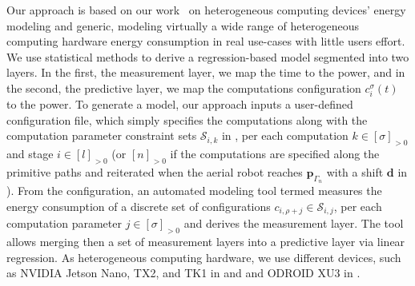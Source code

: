 Our approach is based on our work~\citep{seewald2019coarse} on heterogeneous computing devices' energy modeling and generic, modeling virtually a wide range of heterogeneous computing hardware energy consumption in real use-cases with little users effort. We use statistical methods to derive a regression-based model segmented into two layers. In the first, the measurement layer, we map the time to the power, and in the second, the predictive layer, we map the computations configuration $c_{i}^\sigma(t)$ to the power. To generate a model, our approach inputs a user-defined configuration file, which simply specifies the computations along with the computation parameter constraint sets $\mathcal{S}_{i,k}$ in , per each computation $k\in[\sigma]_{>0}$ and stage $i\in[l]_{>0}$ (or $[n]_{>0}$ if the computations are specified along the primitive paths and reiterated when the aerial robot reaches $\mathbf{p}_{\Gamma_n}$ with a shift $\mathbf{d}$ in ). From the configuration, an automated modeling tool termed \powprof{} measures the energy consumption of a discrete set of configurations $c_{i,\rho+j}\in\mathcal{S}_{i,j}$, per each computation parameter $j\in[\sigma]_{>0}$ and derives the measurement layer. The tool allows merging then a set of measurement layers into a predictive layer via linear regression.
As heterogeneous computing hardware, we use different devices, such as NVIDIA Jetson Nano, TX2, and TK1 in  and  and ODROID XU3 in . 
